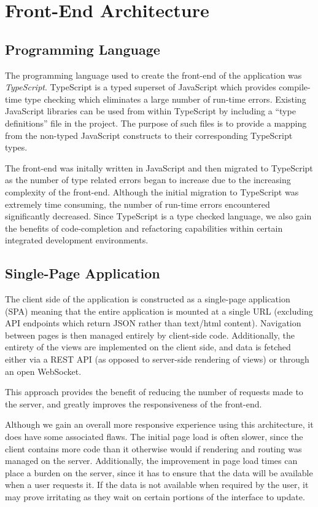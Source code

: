 \documentclass{l4proj}
\begin{document}
        
    \section{Front-End Architecture}
    
        \subsection{Programming Language}
        The programming language used to create the front-end of the application was \textit{TypeScript}. TypeScript is a typed superset of JavaScript which provides compile-time type checking which eliminates a large number of run-time errors. Existing JavaScript libraries can be used from within TypeScript by including a ``type definitions'' file in the project. The purpose of such files is to provide a mapping from the non-typed JavaScript constructs to their corresponding TypeScript types.
        
        The front-end was initally written in JavaScript and then migrated to TypeScript as the number of type related errors began to increase due to the increasing complexity of the front-end. Although the initial migration to TypeScript was extremely time consuming, the number of run-time errors encountered significantly decreased. Since TypeScript is a type checked language, we also gain the benefits of code-completion and refactoring capabilities within certain integrated development environments.
    
        \subsection{Single-Page Application}
    The client side of the application is constructed as a single-page application (SPA) meaning that the entire application is mounted at a single URL (excluding API endpoints which return JSON rather than text/html content). Navigation between pages is then managed entirely by client-side code. Additionally, the entirety of the views are implemented on the client side, and data is fetched either via a REST API (as opposed to server-side rendering of views) or through an open WebSocket. 

This approach provides the benefit of reducing the number of requests made to the server, and greatly improves the responsiveness of the front-end. 

Although we gain an overall more responsive experience using this architecture, it does have some associated flaws. The initial page load is often slower, since the client contains more code than it otherwise would if rendering and routing was managed on the server. Additionally, the improvement in page load times can place a burden on the server, since it has to ensure that the data will be available when a user requests it. If the data is not available when required by the user, it may prove irritating as they wait on certain portions of the interface to update.
\end{document}
